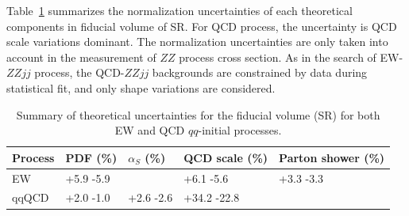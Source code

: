 Table~\ref{tab:syst_theo_sr} summarizes the normalization uncertainties of each theoretical components in fiducial volume of SR.
For QCD process, the uncertainty is QCD scale variations dominant.
The normalization uncertainties are only taken into account in the measurement of $ZZ$ process cross section.
As in the search of EW-$ZZjj$ process, the QCD-$ZZjj$ backgrounds are constrained by data during statistical fit, and only shape variations are considered.
\begin{table}[!htb]
\small
\begin{center}
\begin{tabular}{lllll} 
\hline\hline
Process     & PDF (\%)  & $\alpha_{S}$ (\%) & QCD scale (\%) & Parton shower (\%) \\
\hline
EW         & +5.9 -5.9 &                   & +6.1 -5.6      & +3.3 -3.3          \\
qqQCD      & +2.0 -1.0 & +2.6 -2.6         & +34.2 -22.8    &                    \\
\hline\hline
\end{tabular}
\caption{
Summary of theoretical uncertainties for the fiducial volume (SR) for both EW and QCD $qq$-initial processes.
}
\label{tab:syst_theo_sr}
\end{center}
\end{table}


